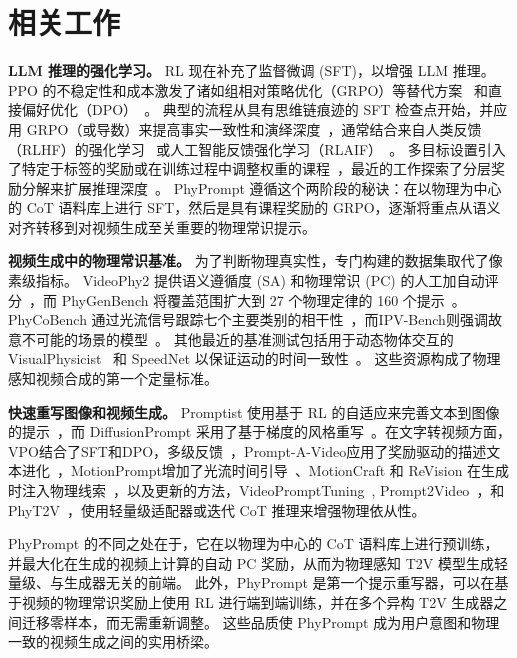\section{相关工作}
\label{sec:related}

\noindent\textbf{LLM 推理的强化学习。}
RL 现在补充了监督微调 (SFT)，以增强 LLM 推理。
PPO 的不稳定性和成本激发了诸如组相对策略优化（GRPO）等替代方案~\cite{shao2024grpo,li2025mogrp} 和直接偏好优化（DPO）~\cite{goffer2023dpo}。
典型的流程从具有思维链痕迹的 SFT 检查点开始，并应用 GRPO（或导数）来提高事实一致性和演绎深度~\cite{yue2025cot,zhang2025sgrpo}，通常结合来自人类反馈（RLHF）的强化学习~\cite{outrun2023rlhf} 或人工智能反馈强化学习（RLAIF）~\cite{rajesh2024rlaif}。
多目标设置引入了特定于标签的奖励或在训练过程中调整权重的课程~\cite{chen2025emorl,shibata2025dynamicrl}，最近的工作探索了分层奖励分解来扩展推理深度~\cite{nakano2023hapt}。
PhyPrompt 遵循这个两阶段的秘诀：在以物理为中心的 CoT 语料库上进行 SFT，然后是具有课程奖励的 GRPO，逐渐将重点从语义对齐转移到对视频生成至关重要的物理常识提示。

\noindent\textbf{视频生成中的物理常识基准。}
为了判断物理真实性，专门构建的数据集取代了像素级指标。
VideoPhy2 提供语义遵循度 (SA) 和物理常识 (PC) 的人工加自动评分~\cite{bansal2025videophy2}，而 PhyGenBench 将覆盖范围扩大到 27 个物理定律的 160 个提示~\cite{phygenbench2024}。
PhyCoBench 通过光流信号跟踪七个主要类别的相干性~\cite{chen2025phycobench}，而IPV-Bench则强调故意不可能的场景的模型~\cite{wang2025ipvbench}。
其他最近的基准测试包括用于动态物体交互的 VisualPhysicist~\cite{singh2024visualphysicist} 和 SpeedNet 以保证运动的时间一致性~\cite{kim2023speednet}。
这些资源构成了物理感知视频合成的第一个定量标准。

\noindent\textbf{快速重写图像和视频生成。}
Promptist 使用基于 RL 的自适应来完善文本到图像的提示~\cite{hao2023promptist}，而 DiffusionPrompt 采用了基于梯度的风格重写~\cite{lee2023diffusionprompt}。在文字转视频方面，VPO结合了SFT和DPO，多级反馈~\cite{cheng2025vpo}，Prompt-A-Video应用了奖励驱动的描述文本进化~\cite{ji2024prompt}，MotionPrompt增加了光流时间引导~\cite{nam2024motionprompt}、MotionCraft 和 ReVision 在生成时注入物理线索~\cite{agnolucci2024motioncraft,wang2025revision}，以及更新的方法，VideoPromptTuning~\cite{xu2024vpt}, Prompt2Video~\cite{fernandez2024prompt2video}，和 PhyT2V~\cite{xue2024phyt2v}，使用轻量级适配器或迭代 CoT 推理来增强物理依从性。

PhyPrompt 的不同之处在于，它在以物理为中心的 CoT 语料库上进行预训练，并最大化在生成的视频上计算的自动 PC 奖励，从而为物理感知 T2V 模型生成轻量级、与生成器无关的前端。
此外，PhyPrompt 是第一个提示重写器，可以在基于视频的物理常识奖励上使用 RL 进行端到端训练，并在多个异构 T2V 生成器之间迁移零样本，而无需重新调整。
这些品质使 PhyPrompt 成为用户意图和物理一致的视频生成之间的实用桥梁。
